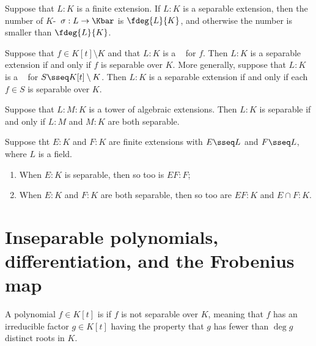 \documentclass{article}
\begin{document}
  \begin{tcorollary}
    Suppose that \( L:K \) is a finite extension.
    If \( L:K \) is a separable extension, then the number of \( K \)-\homo~\( \sigma:L\to\Kbar \) is \( \fdeg{L}{K} \), and otherwise the number is smaller than \( \fdeg{L}{K} \).
  \end{tcorollary}

  \begin{tcorollary}
    Suppose that \( f\in K[t]\setminus K \) and that \( L:K \) is a \sfe~ for \( f \).
    Then \( L:K \) is a separable extension if and only if \( f \) is separable over \( K \).
    More generally, suppose that \( L:K \) is a \sfe~ for \( S\sseq K[t]\setminus K \).
    Then \( L:K \) is a separable extension if and only if each \( f\in S \) is separable over \( K \).
  \end{tcorollary}

  \begin{ttheorem}
    Suppose that \( L:M:K \) is a tower of algebraic extensions.
    Then \( L:K \) is separable if and only if \( L:M \) and \( M:K \) are both separable.
  \end{ttheorem}

  \begin{ttheorem}
    Suppose tht \( E:K \) and \( F:K \) are finite extensions with \( E\sseq L \) and \( F\sseq L \), where \( L \) is a field.
    \begin{enumerate}[label=(\alph*)]
      \item When \( E:K \) is separable, then so too is \( EF:F \);
      \item When \( E:K \) and \( F:K \) are both separable, then so too are \( EF:K \) and \( E\cap F:K \).
    \end{enumerate}
  \end{ttheorem}

\section{Inseparable polynomials, differentiation, and the Frobenius map}
  \begin{tdefinition}[Inseparable]
    A polynomial \( f \in K[t] \) is  if \( f \) is not separable over \( K \), meaning that \( f \) has an irreducible factor \( g \in K[t] \) having the property that \( g \) has fewer than \( \deg g \) distinct roots in \( K \).
  \end{tdefinition}
\end{document}
